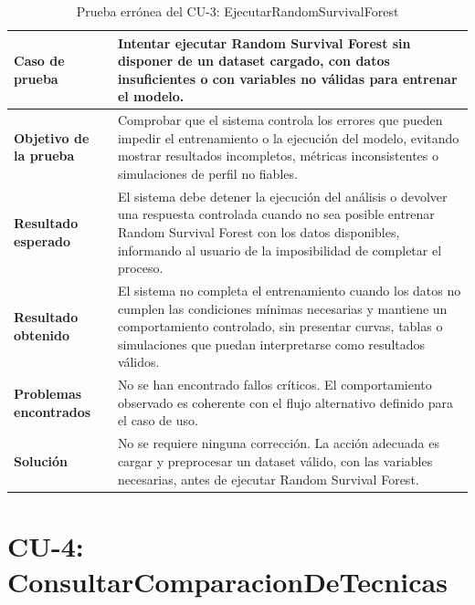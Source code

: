 \begin{table}[H]
\centering
\small
\begin{tabularx}{\textwidth}{|p{}|X|}
\hline
\textbf{Caso de prueba} & Intentar ejecutar Random Survival Forest sin disponer de un dataset cargado, con datos insuficientes o con variables no válidas para entrenar el modelo. \\ \hline
\textbf{Objetivo de la prueba} & Comprobar que el sistema controla los errores que pueden impedir el entrenamiento o la ejecución del modelo, evitando mostrar resultados incompletos, métricas inconsistentes o simulaciones de perfil no fiables. \\ \hline
\textbf{Resultado esperado} & El sistema debe detener la ejecución del análisis o devolver una respuesta controlada cuando no sea posible entrenar Random Survival Forest con los datos disponibles, informando al usuario de la imposibilidad de completar el proceso. \\ \hline
\textbf{Resultado obtenido} & El sistema no completa el entrenamiento cuando los datos no cumplen las condiciones mínimas necesarias y mantiene un comportamiento controlado, sin presentar curvas, tablas o simulaciones que puedan interpretarse como resultados válidos. \\ \hline
\textbf{Problemas encontrados} & No se han encontrado fallos críticos. El comportamiento observado es coherente con el flujo alternativo definido para el caso de uso. \\ \hline
\textbf{Solución} & No se requiere ninguna corrección. La acción adecuada es cargar y preprocesar un dataset válido, con las variables necesarias, antes de ejecutar Random Survival Forest. \\ \hline
\end{tabularx}
\caption{Prueba errónea del CU-3: EjecutarRandomSurvivalForest}
\label{tab:prueba_erronea_cu3}
\normalsize
\end{table}

\Needspace{0.80\textheight}
\section{CU-4: ConsultarComparacionDeTecnicas}


